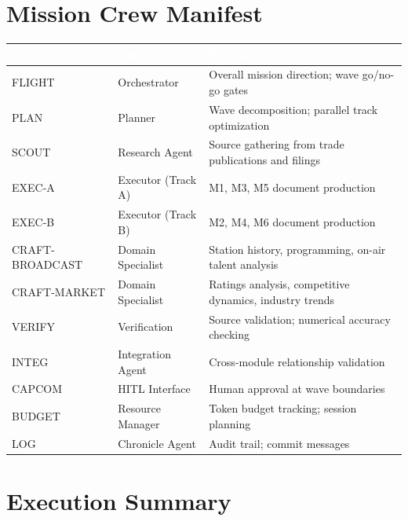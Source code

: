 \documentclass[11pt,letterpaper]{article}
\newcommand{\tableheader}[1]{\textbf{\sffamily\textcolor{white}{#1}}}
\begin{document}
\section{Mission Crew Manifest}

\begin{center}
\begin{tabularx}{\textwidth}{L{2.5cm}L{2.5cm}X}
\toprule
{}
\tableheader{Role} & \tableheader{Agent} & \tableheader{Responsibility} \\
\midrule
FLIGHT & Orchestrator & Overall mission direction; wave go/no-go gates \\
PLAN & Planner & Wave decomposition; parallel track optimization \\
SCOUT & Research Agent & Source gathering from trade publications and filings \\
EXEC-A & Executor (Track A) & M1, M3, M5 document production \\
EXEC-B & Executor (Track B) & M2, M4, M6 document production \\
CRAFT-BROADCAST & Domain Specialist & Station history, programming, on-air talent analysis \\
CRAFT-MARKET & Domain Specialist & Ratings analysis, competitive dynamics, industry trends \\
VERIFY & Verification & Source validation; numerical accuracy checking \\
INTEG & Integration Agent & Cross-module relationship validation \\
CAPCOM & HITL Interface & Human approval at wave boundaries \\
BUDGET & Resource Manager & Token budget tracking; session planning \\
LOG & Chronicle Agent & Audit trail; commit messages \\
\bottomrule
\end{tabularx}
\end{center}

\section{Execution Summary}
\end{document}
